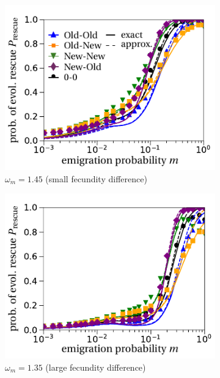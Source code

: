 \documentclass[a4paper,11pt]{article}
\begin{document}
\begin{figure}[t!]
	\centering
	\begin{subfigure}{.5\textwidth}
  		\centering
  		\includegraphics[width=\linewidth]{fig5a.pdf}
  		\caption{$\omega_m=1.45$ (small fecundity difference)}
	\end{subfigure}%
	\begin{subfigure}{.5\textwidth}
  		\centering
  		\includegraphics[width=\linewidth]{fig5b.pdf}
  		\caption{$\omega_m=1.35$ (large fecundity difference)}
	\end{subfigure}
	\begin{subfigure}{.5\textwidth}
  		\centering

\end{subfigure}
\end{figure}
\end{document}
